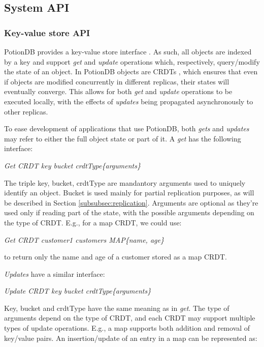 \documentclass{vldb}
\newcommand{\emphvspace}{0.5\baselineskip}
\newcommand{\lineemph}[1]{\vspace{\emphvspace}\hspace{2em}\emph{#1}\vspace{\emphvspace}}
\begin{document}
\subsection{System API}

\subsubsection{Key-value store API}

PotionDB provides a key-value store interface \cite{???}.
As such, all objects are indexed by a key and support \emph{get} and \emph{update} operations which, respectively, query/modify the state of an object.
In PotionDB objects are CRDTs \cite{???}, which ensures that even if objects are modified concurrently in different replicas, their states will eventually converge.
This allows for both \emph{get} and \emph{update} operations to be executed locally, with the effects of \emph{updates} being propagated asynchronously to other replicas.

To ease development of applications that use PotionDB, both \emph{gets} and \emph{updates} may refer to either the full object state or part of it.
A \emph{get} has the following interface: %

\lineemph{Get CRDT key bucket crdtType\{arguments\}}

The triple key, bucket, crdtType are mandantory arguments used to uniquely identify an object.
Bucket is used mainly for partial replication purposes, as will be described in Section \ref{subsubsec:replication}. 
Arguments are optional as they're used only if reading part of the state, with the possible arguments depending on the type of CRDT. 
E.g., for a map CRDT, we could use: 

\lineemph{Get CRDT customer1 customers MAP\{name, age\}}

to return only the name and age of a customer stored as a map CRDT.

\emph{Updates} have a similar interface:

\lineemph{Update CRDT key bucket crdtType\{arguments\}}

Key, bucket and crdtType have the same meaning as in \emph{get}.
The type of arguments depend on the type of CRDT, and each CRDT may support multiple types of update operations. 
E.g., a map supports both addition and removal of key/value pairs.
An insertion/update of an entry in a map can be represented as: \\
\end{document}
